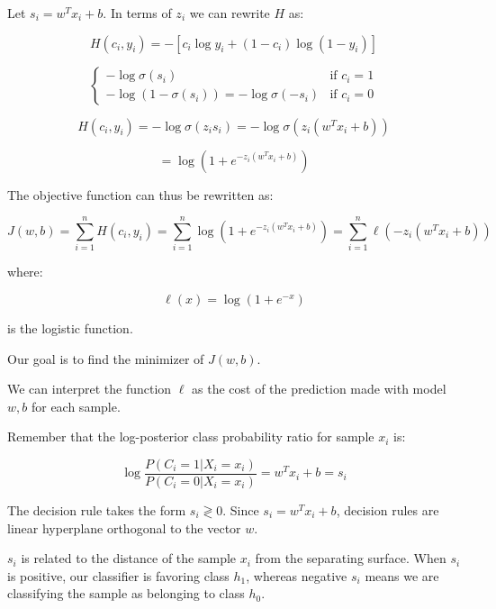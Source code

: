 Let $s_i = w^T x_i + b$. In terms of $z_i$ we can rewrite $H$ as:

\[
H(c_i, y_i) = -[c_i \log y_i + (1-c_i) \log (1-y_i)]
\]


\begin{equation*}
\begin{cases}
-\log \sigma(s_i) & \text{if } c_i = 1 \\
-\log (1-\sigma(s_i)) = -\log \sigma(-s_i) & \text{if } c_i = 0
\end{cases}
\end{equation*}

\begin{equation*}
H(c_i, y_i) = -\log \sigma(z_i s_i) = -\log \sigma(z_i (w^T x_i + b))
\end{equation*}

\begin{equation*}
= \log(1 + e^{-z_i (w^T x_i + b)})
\end{equation*}

The objective function can thus be rewritten as:


\begin{equation*}
J(w, b) = \sum_{i=1}^n H(c_i, y_i) = \sum_{i=1}^n \log(1 + e^{-z_i (w^T x_i + b)}) = \sum_{i=1}^n \ell(-z_i (w^T x_i + b))
\end{equation*}

where:


\begin{equation*}
\ell(x) = \log(1 + e^{-x})
\end{equation*}

is the logistic function.

Our goal is to find the minimizer of $J(w, b)$.

We can interpret the function $\ell$ as the cost of the prediction made with model $w, b$ for each sample.

Remember that the log-posterior class probability ratio for sample $x_i$ is:


\begin{equation*}
\log \frac{P(C_i = 1 | X_i = x_i)}{P(C_i = 0 | X_i = x_i)} = w^T x_i + b = s_i
\end{equation*}

The decision rule takes the form $s_i \gtrless 0$. Since $s_i = w^T x_i + b$, decision rules are linear hyperplane orthogonal to the vector $w$.

$s_i$ is related to the distance of the sample $x_i$ from the separating surface. When $s_i$ is positive, our classifier is favoring class $h_1$, whereas negative $s_i$ means we are classifying the sample as belonging to class $h_0$.

